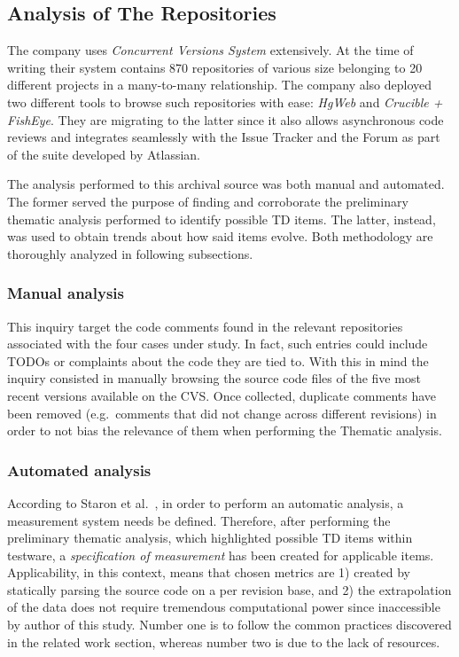 \subsection{Analysis of The Repositories} \label{sec:analysis_of_the_repos}
The company uses \textit{Concurrent Versions System} extensively. At the time of writing their system contains 870 repositories of various size belonging to 20 different projects in a many-to-many relationship. The company also deployed two different tools to browse such repositories with ease: \textit{HgWeb} and \textit{Crucible + FishEye}. They are migrating to the latter since it also allows asynchronous code reviews and integrates seamlessly with the Issue Tracker and the Forum as part of the suite developed by Atlassian.

The analysis performed to this archival source was both manual and automated. The former served the purpose of finding and corroborate the preliminary thematic analysis performed to identify possible TD items. The latter, instead, was used to obtain trends about how said items evolve. Both methodology are thoroughly analyzed in following subsections.

\subsubsection{Manual analysis}
    This inquiry target the code comments found in the relevant repositories associated with the four cases under study. In fact, such entries could include TODOs or complaints about the code they are tied to. With this in mind the inquiry consisted in manually browsing the source code files of the five most recent versions available on the CVS. Once collected, duplicate comments have been removed (e.g.\ comments that did not change across different revisions) in order to not bias the relevance of them when performing the Thematic analysis.


\subsubsection{Automated analysis} \label{sec:automated_analysis}
    According to Staron et al.\ \cite{metrics_paper}, in order to perform an automatic analysis, a measurement system needs be defined. Therefore, after performing the preliminary thematic analysis, which highlighted possible TD items within testware, a \textit{specification of measurement} has been created for applicable items. Applicability, in this context, means that chosen metrics are 1) created by statically parsing the source code on a per revision base, and 2) the extrapolation of the data does not require tremendous computational power since inaccessible by author of this study. Number one is to follow the common practices discovered in the related work section, whereas number two is due to the lack of resources.

